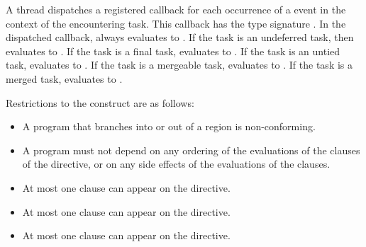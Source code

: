 \tools

A thread dispatches a registered 
callback for each occurrence of a  event
in the context of the encountering task.
This callback has the type signature .
In the dispatched callback,  always
evaluates to .
If the task is an undeferred task, then  evaluates to .
If the task is a final task,  evaluates to .
If the task is an untied task,  evaluates to .
If the task is a mergeable task,  evaluates to .
If the task is a merged task,  evaluates to .

\restrictions
Restrictions to the  construct are as follows:

\begin{itemize}
\item A program that branches into or out of a  region is non-conforming.

\item A program must not depend on any ordering of the evaluations of the clauses of the
 directive, or on any side effects of the evaluations of the clauses.

\item At most one  clause can appear on the directive.

\item At most one  clause can appear on the directive.

\item At most one  clause can appear on the directive.


\end{itemize}

